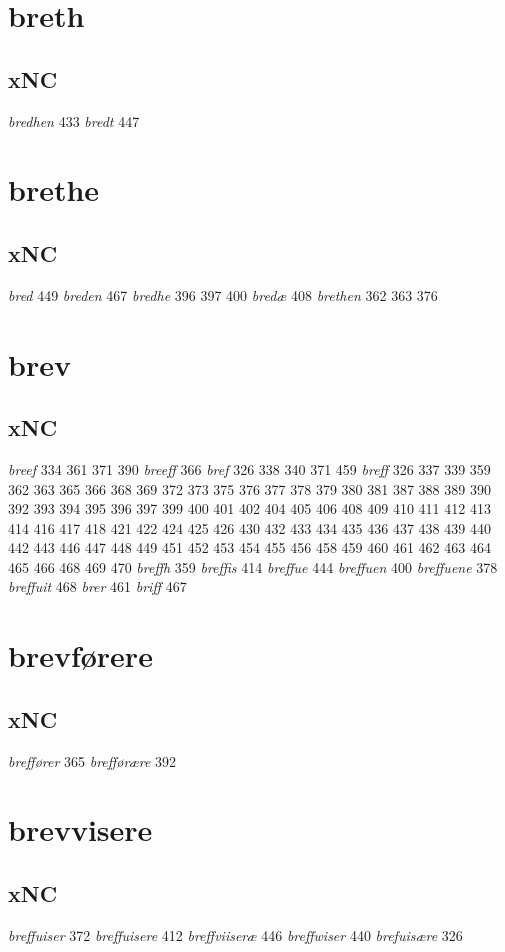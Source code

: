 \documentclass[a4paper,twocolumn]{article}
\begin{document}
\section{breth}
\label{sec:orgf4db6fe}
\subsection{xNC}
\label{sec:orgb38940e}
\emph{bredhen} 433 \emph{bredt} 447 
\section{brethe}
\label{sec:org316942f}
\subsection{xNC}
\label{sec:org8596205}
\emph{bred} 449 \emph{breden} 467 \emph{bredhe} 396 397 400 \emph{bredæ} 408 \emph{brethen} 362 363 376 
\section{brev}
\label{sec:org591de8e}
\subsection{xNC}
\label{sec:org1cc7514}
\emph{breef} 334 361 371 390 \emph{breeff} 366 \emph{bref} 326 338 340 371 459 \emph{breff} 326 337 339 359 362 363 365 366 368 369 372 373 375 376 377 378 379 380 381 387 388 389 390 392 393 394 395 396 397 399 400 401 402 404 405 406 408 409 410 411 412 413 414 416 417 418 421 422 424 425 426 430 432 433 434 435 436 437 438 439 440 442 443 446 447 448 449 451 452 453 454 455 456 458 459 460 461 462 463 464 465 466 468 469 470 \emph{breffh} 359 \emph{breffis} 414 \emph{breffue} 444 \emph{breffuen} 400 \emph{breffuene} 378 \emph{breffuit} 468 \emph{brer} 461 \emph{briff} 467 
\section{brevførere}
\label{sec:org0fe4876}
\subsection{xNC}
\label{sec:orge5df811}
\emph{breffører} 365 \emph{brefførære} 392 
\section{brevvisere}
\label{sec:org9716da1}
\subsection{xNC}
\label{sec:org7b79623}
\emph{breffuiser} 372 \emph{breffuisere} 412 \emph{breffviiseræ} 446 \emph{breffwiser} 440 \emph{brefuisære} 326 
\end{document}
